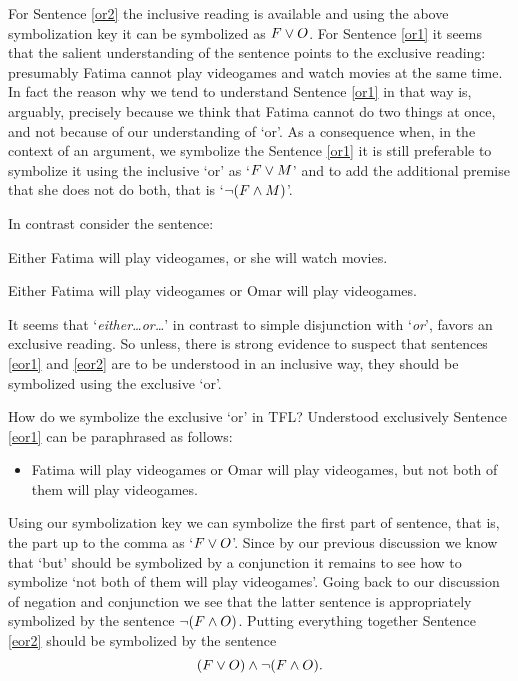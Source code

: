For Sentence \ref{or2} the inclusive reading is available and using the above symbolization key it can be symbolized as $F\vee O$. For Sentence \ref{or1} it seems that the salient understanding of the sentence points to the exclusive reading: presumably Fatima cannot play videogames and watch movies at the same time. In fact the reason why we tend to understand Sentence \ref{or1} in that way is, arguably, precisely because we think that Fatima cannot do two things at once, and not because of our understanding of `or'. As a consequence when, in the context of an argument, we symbolize the Sentence \ref{or1} it is still preferable to symbolize it using the inclusive `or' as `$F\vee M$' and to add the additional premise that she does not do both, that is `$\neg(F\mathbin{\wedge} M)$'.

In contrast consider the sentence:
\begin{earg}
		\item[\ex{eor1}] Either Fatima will play videogames, or she will watch movies.
		\item[\ex{eor2}] Either Fatima will play videogames or Omar will play videogames.
	\end{earg}

It seems that `\emph{either\ldots or\ldots}' in contrast to simple disjunction with `\emph{or}', favors an exclusive reading. So unless, there is strong evidence to suspect that sentences \ref{eor1} and \ref{eor2} are to be understood in an inclusive way, they should be symbolized using the exclusive `or'.

How do we symbolize the exclusive `or' in TFL? Understood exclusively Sentence \ref{eor1} can be paraphrased as follows:
\begin{itemize}
\item Fatima will play videogames or Omar will play videogames, but not both of them will play videogames.
\end{itemize}
Using our symbolization key we can symbolize the first part of sentence, that is, the part up to the comma as `$F\vee O$'. Since by our previous discussion we know  that `but' should be symbolized by a conjunction it remains to see how to symbolize `not both of them will play videogames'. Going back to our discussion of negation and conjunction we see that the latter sentence is appropriately symbolized by the sentence $\neg(F\mathbin{\wedge} O)$. Putting everything together Sentence \ref{eor2} should be symbolized by the sentence $$(F\vee O)\mathbin{\wedge}\neg(F\mathbin{\wedge} O).$$


